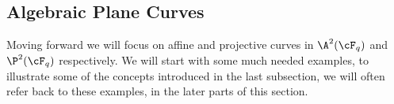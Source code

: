 \subsection{Algebraic Plane Curves}%
\label{subsec:plane_curves}
Moving forward we will focus on affine and projective curves in $\A^{2}(\cF_{q})$ and $\P^{2}(\cF_{q})$ respectively. We will start with some much needed examples, to illustrate some of the concepts introduced in the last subsection, we will often refer back to these examples, in the later parts of this section.

